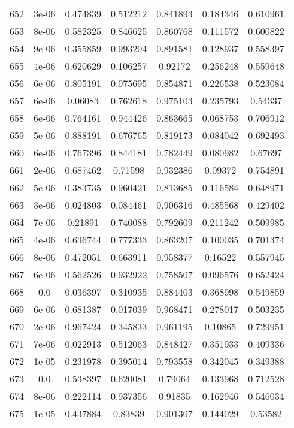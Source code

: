 \begin{table}
\begin{tabular*}{\linewidth}{c|c|c|c|c|c|c}
652 & 3e-06 & 0.474839 & 0.512212 & 0.841893 & 0.184346 & 0.610961\\
653 & 8e-06 & 0.582325 & 0.846625 & 0.860768 & 0.111572 & 0.600822\\
654 & 9e-06 & 0.355859 & 0.993204 & 0.891581 & 0.128937 & 0.558397\\
655 & 4e-06 & 0.620629 & 0.106257 & 0.92172 & 0.256248 & 0.559648\\
656 & 6e-06 & 0.805191 & 0.075695 & 0.854871 & 0.226538 & 0.523084\\
657 & 6e-06 & 0.06083 & 0.762618 & 0.975103 & 0.235793 & 0.54337\\
658 & 6e-06 & 0.764161 & 0.944426 & 0.863665 & 0.068753 & 0.706912\\
659 & 5e-06 & 0.888191 & 0.676765 & 0.819173 & 0.084042 & 0.692493\\
660 & 6e-06 & 0.767396 & 0.844181 & 0.782449 & 0.080982 & 0.67697\\
661 & 2e-06 & 0.687462 & 0.71598 & 0.932386 & 0.09372 & 0.754891\\
662 & 5e-06 & 0.383735 & 0.960421 & 0.813685 & 0.116584 & 0.648971\\
663 & 3e-06 & 0.024803 & 0.084461 & 0.906316 & 0.485568 & 0.429402\\
664 & 7e-06 & 0.21891 & 0.740088 & 0.792609 & 0.211242 & 0.509985\\
665 & 4e-06 & 0.636744 & 0.777333 & 0.863207 & 0.100035 & 0.701374\\
666 & 8e-06 & 0.472051 & 0.663911 & 0.958377 & 0.16522 & 0.557945\\
667 & 6e-06 & 0.562526 & 0.932922 & 0.758507 & 0.096576 & 0.652424\\
668 & 0.0 & 0.036397 & 0.310935 & 0.884403 & 0.368998 & 0.549859\\
669 & 6e-06 & 0.681387 & 0.017039 & 0.968471 & 0.278017 & 0.503235\\
670 & 2e-06 & 0.967424 & 0.345833 & 0.961195 & 0.10865 & 0.729951\\
671 & 7e-06 & 0.022913 & 0.512063 & 0.848427 & 0.351933 & 0.409336\\
672 & 1e-05 & 0.231978 & 0.395014 & 0.793558 & 0.342045 & 0.349388\\
673 & 0.0 & 0.538397 & 0.620081 & 0.79064 & 0.133968 & 0.712528\\
674 & 8e-06 & 0.222114 & 0.937356 & 0.91835 & 0.162946 & 0.546034\\
675 & 1e-05 & 0.437884 & 0.83839 & 0.901307 & 0.144029 & 0.53582\\
\end{tabular*}
\end{table}
